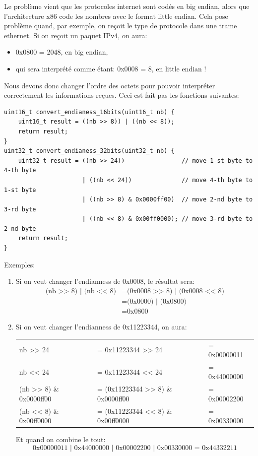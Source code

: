\documentclass[a4paper]{article}
\begin{document}
Le problème vient que les protocoles internet sont codés en big endian, alors que l'architecture x86 code les nombres avec le format little endian. Cela pose problème quand, par exemple, on reçoit le type de protocole dans une trame ethernet. Si on reçoit un paquet IPv4, on aura:
\begin{itemize}
    \item 0x0800 = 2048, en big endian,
    \item qui sera interprété comme étant: 0x0008 = 8, en little endian !
\end{itemize}
Nous devons donc changer l'ordre des octets pour pouvoir interpréter correctement les informations reçues. Ceci est fait pas les fonctions suivantes:
\begin{lstlisting}[style=CStyle]
uint16_t convert_endianess_16bits(uint16_t nb) {
    uint16_t result = ((nb >> 8)) | ((nb << 8));
    return result;
}
uint32_t convert_endianess_32bits(uint32_t nb) {
    uint32_t result = ((nb >> 24))                // move 1-st byte to 4-th byte
                      | ((nb << 24))              // move 4-th byte to 1-st byte
                      | ((nb >> 8) & 0x0000ff00)  // move 2-nd byte to 3-rd byte
                      | ((nb << 8) & 0x00ff0000); // move 3-rd byte to 2-nd byte
    return result;
}
\end{lstlisting}
Exemples:
\begin{enumerate}
    \item Si on veut changer l'endianness de 0x0008, le résultat sera:
    \[ \begin{aligned}
        \text{(nb >{}> 8) | (nb <{}< 8)}
        &= \text{(0x0008 >{}> 8) | (0x0008 <{}< 8)} \\
        &= \text{(0x0000) | (0x0800)} \\
        &= \text{0x0800}
    \end{aligned} \]
    \item Si on veut changer l'endianness de 0x11223344, on aura:
    \begin{center}
        \begin{tabular}{lll}
            nb >{}> 24                & = 0x11223344 >{}> 24                & = 0x00000011 \\
            nb <{}< 24                & = 0x11223344 <{}< 24                & = 0x44000000 \\
            (nb >{}> 8) \& 0x0000ff00 & = (0x11223344 >{}> 8) \& 0x0000ff00 & = 0x00002200 \\
            (nb <{}< 8) \& 0x00ff0000 & = (0x11223344 <{}< 8) \& 0x00ff0000 & = 0x00330000 \\
        \end{tabular}
    \end{center}
    Et quand on combine le tout:
    \[ \text{0x00000011 | 0x44000000 | 0x00002200 | 0x00330000 = 0x44332211} \]
\end{enumerate}
\end{document}
